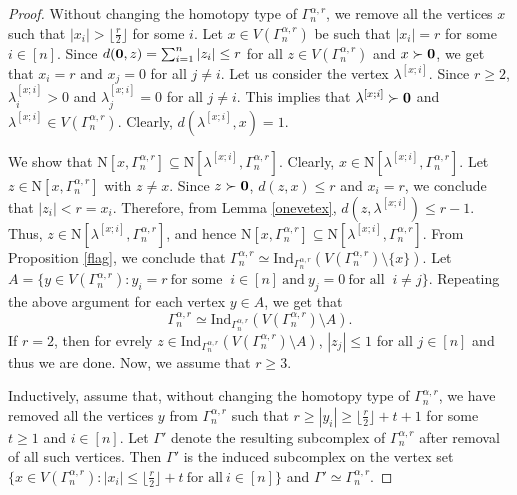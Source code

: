 \documentclass{amsart}
\theoremstyle{definition}
\theoremstyle{remark}
\numberwithin{equation}{section}
\newcommand{\f}{\lfloor\frac{r}{2}\rfloor}
\def\n{{\mathrm{N}}}
\begin{document}
\begin{proof}
	Without changing the homotopy type of $\Gamma_{n}^{\alpha,r}$, we remove all the vertices $x$ such that  $|x_i| > \f$ for some $i$. Let $x \in V(\Gamma_n^{\alpha, r})$ be such that $|x_i| = r$ for some $i \in [n]$.  Since  $d({\bf{0}}, z)  = \sum_{i=1}^{n} |z_i| \leq r$ for all $z \in V(\Gamma_n^{\alpha, r})$ and $x \succ {\bf{0}}$, we get that  $x_i = r$ and $x_j = 0$ for all $j \neq i$. Let us consider the vertex $\lambda^{[x;i]}$. Since $r \geq 2$, $\lambda_i^{[x;i]}>0$ and $\lambda_j^{[x;i]}=0$ for all $j\neq i$. This implies that  $\lambda^{[x;i]} \succ {\bf{0}}$ and $\lambda^{[x;i]} \in V(\Gamma_n^{\alpha, r})$. Clearly, $d(\lambda^{[x;i]}, x) = 1$.
	
	We show that $\n[x, \Gamma_{n}^{\alpha,r}] \subseteq \n[\lambda^{[x;i]}, \Gamma_{n}^{\alpha,r}]$. Clearly, $x \in \n[\lambda^{[x;i]}, \Gamma_{n}^{\alpha,r}]$. Let $z \in \n[x, \Gamma_n^{\alpha, r}]$ with $z \neq x$.  Since $z \succ {\bf{0}}$, $d(z, x) \leq r$ and $x_i = r$, we conclude that $|z_i | < r = x_i$. Therefore, from Lemma \ref{onevetex}, $d(z, \lambda^{[x;i]}) \leq r-1$. Thus, $z \in \n[\lambda^{[x;i]}, \Gamma_{n}^{\alpha,r}]$, and hence $\n[x, \Gamma_{n}^{\alpha,r}] \subseteq \n[\lambda^{[x;i]}, \Gamma_{n}^{\alpha,r}]$. From Proposition \ref{flag}, we conclude that $\Gamma_n^{\alpha, r} \simeq \mathrm{Ind}_{\Gamma_n^{\alpha, r}}\left(V(\Gamma_{n}^{\alpha,r}) \setminus \{x\}\right).$
	Let $A= \{y \in  V(\Gamma_{n}^{\alpha,r}) : y_i = r \ \text{for some } \ i \in [n] \ \text{and} \  y_j = 0 \ \text{for all } \ i \neq j \}$.
	Repeating the above argument for each vertex $y \in A$, we get  that 
	$$
	\Gamma_n^{\alpha, r} \simeq \mathrm{Ind}_{\Gamma_n^{\alpha, r}}\left(V(\Gamma_n^{\alpha, r}) \setminus A \right).
	$$
   If $r=2$, then for evrely $z\in \mathrm{Ind}_{\Gamma_n^{\alpha, r}}\left(V(\Gamma_n^{\alpha, r}) \setminus A \right)$, $|z_j|\leq 1$ for all $j\in [n]$ and thus we are done. Now, we assume that $r\geq 3$.	
   
   Inductively, assume that, without changing the homotopy type of  $\Gamma_{n}^{\alpha,r}$, we have removed all the vertices $y$ from $\Gamma_n^{\alpha, r}$ such that $r \geq |y_i| \geq \f + t + 1$ for some $t \geq 1$ and $i \in [n]$.  Let  $\Gamma'$ denote the resulting subcomplex of $\Gamma_{n}^{\alpha,r}$ after removal of all such vertices. Then   $\Gamma'$ is the induced  subcomplex on the vertex set $\{x\in V(\Gamma_{n}^{\alpha,r}): |x_i| \leq \f + t \ \text{for all} \ i\in [n]\}$ and $\Gamma'\simeq \Gamma_{n}^{\alpha,r}$. 
	

\end{proof}
\end{document}
